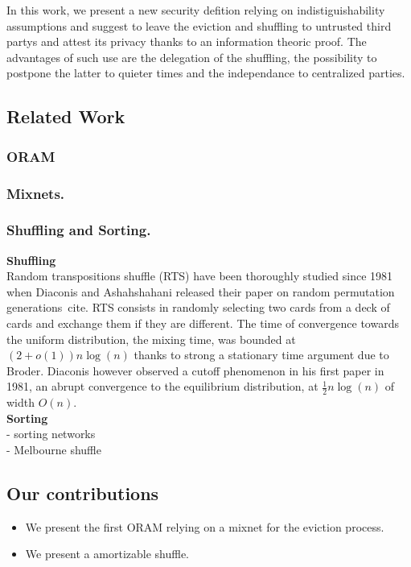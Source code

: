 \documentclass[a4paper]{article}
\begin{document}
In this work, we present a new security defition relying on indistiguishability assumptions and suggest to leave the eviction and shuffling to untrusted third partys and attest its privacy thanks to an information theoric proof.
The advantages of such use are the delegation of the shuffling, the possibility to postpone the latter to quieter times and the independance to centralized parties.

\subsection{Related Work}
\subsubsection{ORAM}

\subsubsection{Mixnets.}

\subsubsection{Shuffling and Sorting.}


\noindent\textbf{Shuffling} \\

Random transpositions shuffle (RTS) have been thoroughly studied since 1981 when Diaconis and Ashahshahani released their paper on random permutation generations~cite{}.
RTS consists in randomly selecting two cards from a deck of cards and exchange them if they are different.
The time of convergence towards the uniform distribution, the mixing time, was bounded at $\left(2+o(1)\right)n\log(n)$ thanks to strong a stationary time argument due to Broder\cite{}.
Diaconis however observed a cutoff phenomenon in his first paper in 1981, an abrupt convergence to the equilibrium distribution, at $\frac{1}{2}n\log(n)$ of width $O(n)$.\\

\noindent\textbf{Sorting} \\
- sorting networks\\
- Melbourne shuffle\\

\subsection{Our contributions}
\begin{itemize}
 \item We present the first ORAM relying on a mixnet for the eviction process.
 \item We present a amortizable shuffle.
\end{itemize}
\end{document}
